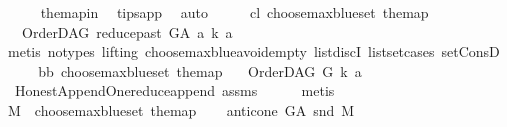 \begin{isabellebody}
\ \ \ \ \isamarkupfalse%
\ the{\isacharunderscore}{\kern0pt}map{\isacharunderscore}{\kern0pt}in\ \isamarkupfalse%
\ tips{\isacharunderscore}{\kern0pt}app\ \isamarkupfalse%
\ auto\isanewline
\ \ \isamarkupfalse%
\ \isamarkupfalse%
\ c{\isacharunderscore}{\kern0pt}l{\isacharcolon}{\kern0pt}\ {\isachardoublequoteopen}choose{\isacharunderscore}{\kern0pt}max{\isacharunderscore}{\kern0pt}blue{\isacharunderscore}{\kern0pt}set\ the{\isacharunderscore}{\kern0pt}map\isanewline
\ \ {\isacharequal}{\kern0pt}\ {\isacharparenleft}{\kern0pt}{\isacharparenleft}{\kern0pt}OrderDAG\ {\isacharparenleft}{\kern0pt}reduce{\isacharunderscore}{\kern0pt}past\ G{\isacharunderscore}{\kern0pt}A\ a{\isacharparenright}{\kern0pt}\ k{\isacharparenright}{\kern0pt}{\isacharcomma}{\kern0pt}\ a{\isacharparenright}{\kern0pt}{\isachardoublequoteclose}\isanewline
\ \ \ \ \isamarkupfalse%
\ {\isacharparenleft}{\kern0pt}metis\ {\isacharparenleft}{\kern0pt}no{\isacharunderscore}{\kern0pt}types{\isacharcomma}{\kern0pt}\ lifting{\isacharparenright}{\kern0pt}\ choose{\isacharunderscore}{\kern0pt}max{\isacharunderscore}{\kern0pt}blue{\isacharunderscore}{\kern0pt}avoid{\isacharunderscore}{\kern0pt}empty\ list{\isachardot}{\kern0pt}discI\ list{\isachardot}{\kern0pt}set{\isacharunderscore}{\kern0pt}cases\ set{\isacharunderscore}{\kern0pt}ConsD{\isacharparenright}{\kern0pt}\isanewline
\ \ \isamarkupfalse%
\ \isamarkupfalse%
\ bb{\isacharcolon}{\kern0pt}\ {\isachardoublequoteopen}choose{\isacharunderscore}{\kern0pt}max{\isacharunderscore}{\kern0pt}blue{\isacharunderscore}{\kern0pt}set\ the{\isacharunderscore}{\kern0pt}map\isanewline
\ \ {\isacharequal}{\kern0pt}\ {\isacharparenleft}{\kern0pt}{\isacharparenleft}{\kern0pt}OrderDAG\ G\ k{\isacharparenright}{\kern0pt}{\isacharcomma}{\kern0pt}\ a{\isacharparenright}{\kern0pt}{\isachardoublequoteclose}\ \isamarkupfalse%
\ \ Honest{\isacharunderscore}{\kern0pt}Append{\isacharunderscore}{\kern0pt}One{\isachardot}{\kern0pt}reduce{\isacharunderscore}{\kern0pt}append\ assms\isanewline
\ \ \ \ \isamarkupfalse%
\ metis\ \isanewline
\ \ \isamarkupfalse%
\ {\isacharquery}{\kern0pt}M\ {\isacharequal}{\kern0pt}\ {\isachardoublequoteopen}choose{\isacharunderscore}{\kern0pt}max{\isacharunderscore}{\kern0pt}blue{\isacharunderscore}{\kern0pt}set\ the{\isacharunderscore}{\kern0pt}map{\isachardoublequoteclose}\isanewline
\ \ \isamarkupfalse%
\ {\isachardoublequoteopen}anticone\ G{\isacharunderscore}{\kern0pt}A\ {\isacharparenleft}{\kern0pt}snd\ {\isacharquery}{\kern0pt}M{\isacharparenright}{\kern0pt}{\isacharequal}{\kern0pt}\ {\isacharbraceleft}{\kern0pt}{\isacharbraceright}{\kern0pt}{\isachardoublequoteclose}\ \isanewline

\end{isabellebody}
